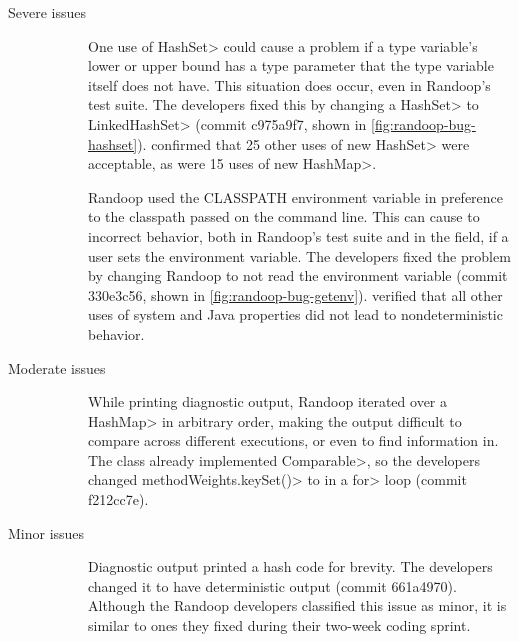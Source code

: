 \begin{description}
\item[Severe issues]
  \strut
\begin{description}
\item[\bugHashSet]
One use of \<HashSet> could cause a problem if a type variable's lower or upper
bound has a type parameter that the type variable itself does not have.
This situation does occur, even in Randoop's test suite.
The developers fixed this by changing a \<HashSet> to \<LinkedHashSet>
(commit c975a9f7, shown in \cref{fig:randoop-bug-hashset}).
\TheDeterminismChecker confirmed that 
25 other uses of \<new HashSet> were acceptable, as were 15 uses of \<new HashMap>.

\item[\bugClasspath]
Randoop used the CLASSPATH environment variable in preference to the
classpath passed on the command line.
This can cause to incorrect behavior, both in Randoop's test suite and in the field,
if a user sets the environment variable.
The developers fixed the problem by changing Randoop to not read the environment variable
(commit 330e3c56, shown in \cref{fig:randoop-bug-getenv}).
\TheDeterminismChecker verified that all other uses of system and Java
properties did not lead to nondeterministic behavior.
\end{description}

\item[Moderate issues]
  \strut
\begin{description}
\item[\bugHashMapOutput]
While printing diagnostic output, Randoop iterated over a \<HashMap> in
arbitrary order, making the output difficult to compare across different
executions, or even to find information in.
The class already implemented \<Comparable>, so
the developers changed \<methodWeights.keySet()> to
 in a \<for> loop (commit
f212cc7e).
\end{description}

\item[Minor issues]
\strut
\begin{description}
 
\item[\bugHashcodeOutput]
  Diagnostic output printed a hash code for brevity.
  The developers changed it to have deterministic output (commit 661a4970).
  Although the Randoop developers classified this issue as minor, it is
  similar to ones they fixed during their two-week coding sprint.


\end{description}
\end{description}
